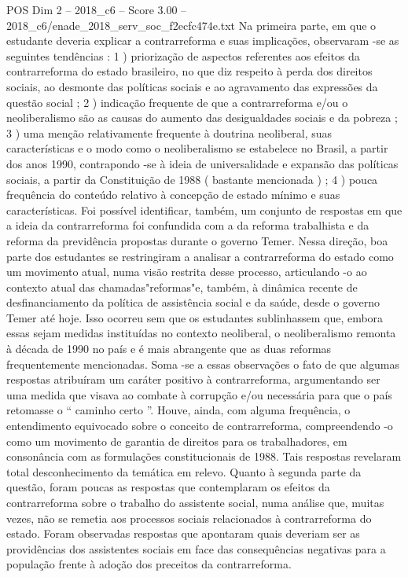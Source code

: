 \begin{textsample}{POS Dim 2 – 2018\_c6 – Score 3.00 – 2018\_c6/enade\_2018\_serv\_soc\_f2ecfc474e.txt}
Na primeira parte, em que o estudante deveria explicar a contrarreforma e suas implicações, observaram -se as seguintes tendências : 1 ) priorização de aspectos referentes aos efeitos da contrarreforma do estado brasileiro, no que diz respeito à perda dos direitos sociais, ao desmonte das políticas sociais e ao agravamento das expressões da questão social ; 2 ) indicação frequente de que a contrarreforma e/ou o neoliberalismo são as causas do aumento das desigualdades sociais e da pobreza ; 3 ) uma menção relativamente frequente à doutrina neoliberal, suas características e o modo como o neoliberalismo se estabelece no Brasil, a partir dos anos 1990, contrapondo -se à ideia de universalidade e expansão das políticas sociais, a partir da Constituição de 1988 ( bastante mencionada ) ; 4 ) pouca frequência do conteúdo relativo à concepção de estado mínimo e suas características.
Foi possível identificar, também, um conjunto de respostas em que a ideia da contrarreforma foi confundida com a da reforma trabalhista e da reforma da previdência propostas durante o governo Temer.
Nessa direção, boa parte dos estudantes se restringiram a analisar a contrarreforma do estado como um movimento atual, numa visão restrita desse processo, articulando -o ao contexto atual das chamadas"reformas"e, também, à dinâmica recente de desfinanciamento da política de assistência social e da saúde, desde o governo Temer até hoje.
Isso ocorreu sem que os estudantes sublinhassem que, embora essas sejam medidas instituídas no contexto neoliberal, o neoliberalismo remonta à década de 1990 no país e é mais abrangente que as duas reformas frequentemente mencionadas.
Soma -se a essas observações o fato de que algumas respostas atribuíram um caráter positivo à contrarreforma, argumentando ser uma medida que visava ao combate à corrupção e/ou necessária para que o país retomasse o “ caminho certo ”.
Houve, ainda, com alguma frequência, o entendimento equivocado sobre o conceito de contrarreforma, compreendendo -o como um movimento de garantia de direitos para os trabalhadores, em consonância com as formulações constitucionais de 1988.
Tais respostas revelaram total desconhecimento da temática em relevo.
Quanto à segunda parte da questão, foram poucas as respostas que contemplaram os efeitos da contrarreforma sobre o trabalho do assistente social, numa análise que, muitas vezes, não se remetia aos processos sociais relacionados à contrarreforma do estado.
Foram observadas respostas que apontaram quais deveriam ser as providências dos assistentes sociais em face das consequências negativas para a população frente à adoção dos preceitos da contrarreforma.

\end{textsample}
